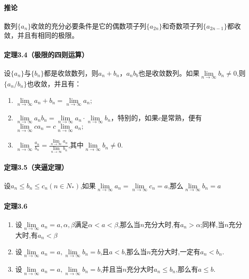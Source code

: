 \documentclass[UTF8]{ctexart}
\begin{document}
	\paragraph{推论}数列$\{a_n\}$收敛的充分必要条件是它的偶数项子列$\{a_{2n}\}$和奇数项子列$\{a_{2n-1}\}$都收敛，并且有相同的极限。
	\paragraph{定理3.4（极限的四则运算）}设$\{a_n\}$与$\{b_n\}$都是收敛数列，则${a_n+b_n}$，${a_nb_b}$也是收敛数列。如果$\lim\limits_{n\to\infty}b_n\neq0$,则$\{a_n/b_n\}$也收敛，并且有：
	\begin{enumerate}
		\item $\lim\limits_{n\to\infty}a_n+b_n=\lim\limits_{n\to\infty}a_n$;
		\item $\lim\limits_{n\to\infty}a_nb_n=\lim\limits_{n\to\infty}a_n \cdot \lim\limits_{n\to\infty}b_n$，特别的，如果$c$是常熟，便有$\lim\limits_{n\to\infty}ca_n=c\lim\limits_{n\to\infty}a_n;$
		\item $\lim\limits_{n\to\infty} \frac{a_n}{b_n}=\frac{\lim\limits_{n\to\infty}a_n}{\lim\limits_{n\to\infty}b_n}$,其中$\lim\limits_{n\to\infty}b_n\neq0.$	
	\end{enumerate}
	\paragraph{定理3.5（夹逼定理）}设$a_n\leq b_n \leq c_n (n\in N_*)$,如果$\lim\limits_{n\to\infty}a_n=\lim\limits_{n\to\infty}c_n=a$,那么$\lim\limits_{n\to\infty}b_n=a$
	\paragraph{定理3.6}
	\begin{enumerate}
		\item 设$\lim\limits_{n\to\infty}a_n=a,\alpha,\beta$满足$\alpha<a<\beta$,那么当$n$充分大时,有$a_n>\alpha$;同样,当$n$充分大时,有$a_n<\beta$
		\item 设$\lim\limits_{n\to\infty}a_n=a,\lim\limits_{n\to\infty}b_n=b$,且$a<b$,那么当$n$充分大时,一定有$a_n<b_n$.
		\item 设$\lim\limits_{n\to\infty}a_n=a,\lim\limits_{n\to\infty}b_n=b$,并且当$n$充分大时$a_n\leq b_n$,那么有$a \leq b$.
	\end{enumerate}
\end{document}

